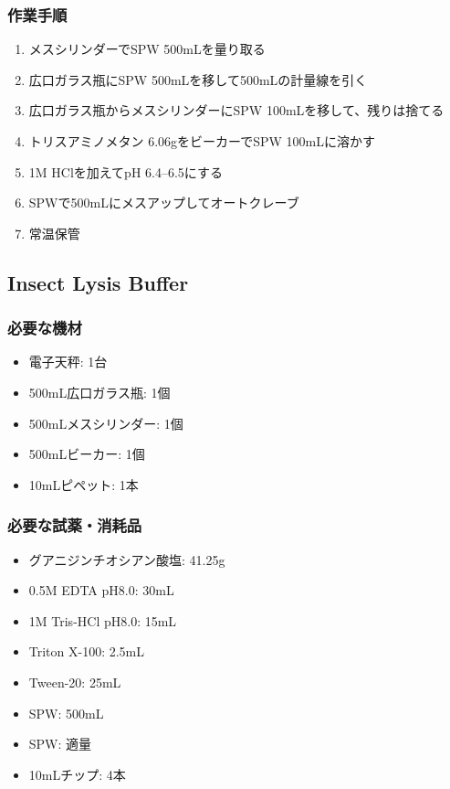 \documentclass[titlepage,10pt,a4paper,uplatex]{jsbook}
\begin{document}
\subsubsection{作業手順}
\begin{enumerate}
\item メスシリンダーでSPW 500mLを量り取る
\item 広口ガラス瓶にSPW 500mLを移して500mLの計量線を引く
\item 広口ガラス瓶からメスシリンダーにSPW 100mLを移して、残りは捨てる
\item トリスアミノメタン 6.06gをビーカーでSPW 100mLに溶かす
\item 1M HClを加えてpH 6.4--6.5にする
\item SPWで500mLにメスアップしてオートクレーブ
\item 常温保管
\end{enumerate}

\subsection{Insect Lysis Buffer}

\subsubsection{必要な機材}
\begin{itemize}
\item 電子天秤: 1台
\item 500mL広口ガラス瓶: 1個
\item 500mLメスシリンダー: 1個
\item 500mLビーカー: 1個
\item 10mLピペット: 1本
\end{itemize}

\subsubsection{必要な試薬・消耗品}
\begin{itemize}
\item グアニジンチオシアン酸塩: 41.25g
\item 0.5M EDTA pH8.0: 30mL
\item 1M Tris-HCl pH8.0: 15mL
\item Triton X-100: 2.5mL
\item Tween-20: 25mL
\item SPW: 500mL
\item SPW: 適量
\item 10mLチップ: 4本
\end{itemize}
\end{document}
